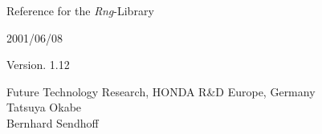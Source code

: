 \begin{LARGE}

{\bf

\begin{center}
Reference for the {\em Rng}-Library\\

\vspace*{10mm}    

2001/06/08\\

\vspace*{10mm}
   
Version. 1.12\\

\end{center}

\vspace*{110mm}

{\normalsize Future Technology Research, HONDA R\&D Europe, Germany}\\
\hspace*{32mm} Tatsuya Okabe\\
\hspace*{32mm} Bernhard Sendhoff\\

}

\end{LARGE}